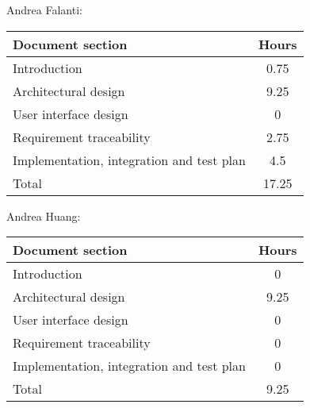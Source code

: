 Andrea Falanti:

\begin{tabular}{|l|c|}
    \hline
    Document section & Hours \\
    \hline
     Introduction & 0.75\\
     Architectural design & 9.25\\
     User interface design & 0\\
     Requirement traceability & 2.75\\
     Implementation, integration and test plan & 4.5\\
     \hline
     Total & 17.25\\
     \hline
\end{tabular}
\vskip 0.3in

Andrea Huang:

\begin{tabular}{|l|c|}
    \hline
    Document section & Hours \\
    \hline
     Introduction & 0\\
     Architectural design & 9.25\\
     User interface design & 0\\
     Requirement traceability & 0\\
     Implementation, integration and test plan & 0\\
     \hline
     Total & 9.25\\
     \hline
\end{tabular}